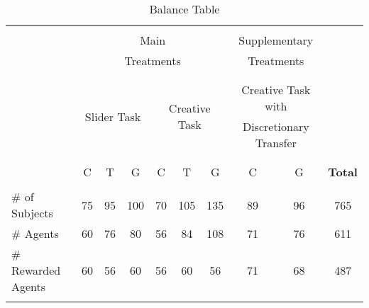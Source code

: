 \begin{landscape}
\begin{table}\caption{Balance Table}
\begin{center}%
{\small\renewcommand{\arraystretch}{0.6}
\begin{tabularx}{\textwidth}{|l|c|c|c|c|c|c||c|c||c|} \cline{2-9}
 \multicolumn{1}{c|}{} & \multicolumn{6}{c||}{} &  \multicolumn{2}{c||}{} &  \multicolumn{1}{c}{}\\
 \multicolumn{1}{c|}{} & \multicolumn{6}{c||}{Main} &  \multicolumn{2}{c||}{Supplementary} & \multicolumn{1}{c}{}\\
  \multicolumn{1}{c|}{} & \multicolumn{6}{c||}{Treatments} &  \multicolumn{2}{c||}{Treatments} & \multicolumn{1}{c}{}\\
 \multicolumn{1}{c|}{} & \multicolumn{6}{c||}{} &  \multicolumn{2}{c||}{} & \multicolumn{1}{c}{} \\
\cline{2-9}
 \multicolumn{1}{c|}{} & \multicolumn{3}{c}{} &  \multicolumn{3}{|c||}{} & \multicolumn{2}{c||}{} &  \multicolumn{1}{c}{} \\
 \multicolumn{1}{c|}{} & \multicolumn{3}{c}{\multirow{2}{*}{Slider Task}} & \multicolumn{3}{|c||}{\multirow{2}{*}{Creative Task}} & \multicolumn{2}{c||}{Creative Task with} &  \multicolumn{1}{c}{}\\
 \multicolumn{1}{c|}{} & \multicolumn{3}{c}{} & \multicolumn{3}{|c||}{} & \multicolumn{2}{c||}{Discretionary Transfer} & \multicolumn{1}{c}{} \\
 \multicolumn{1}{c|}{}& \multicolumn{3}{c}{} &  \multicolumn{3}{|c||}{} &  \multicolumn{2}{c||}{} & \multicolumn{1}{c}{}  \\
\cline{2-10}
\multicolumn{1}{c|}{}   &   &   &   &   &   &   &   &  & \\
\multicolumn{1}{c|}{} 	&	 C 	&	 T 	&	 G 	&	 C 	&	 T 	&	 G 	& \hspace{14pt}	C \hspace{14pt}	& G 	& \bf Total\\
\multicolumn{1}{c|}{} 	&	   	&	   	&	   	&	   	&	   	&	   	&	   	&	    &  \\
\cline{2-9}\hline\noalign{\smallskip}																									
\# of Subjects & 75 & 95 & 100 & 70 & 105 & 135 &  89 & 96 & 765 \\
\# Agents  & 60 & 76 & 80 & 56 & 84 & 108  &71 & 76 & 611 \\
\# Rewarded Agents & 60 & 56 & 60 & 56 & 60 & 56 &  71 & 68 & 487 \\
 & & & & & & & & & \\

\end{tabularx}}
\end{center}
\end{table}
\end{landscape}
